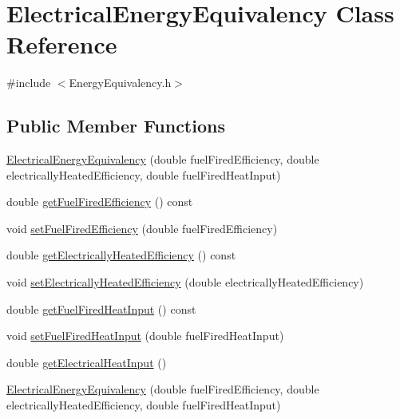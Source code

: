 \hypertarget{class_electrical_energy_equivalency}{}\section{Electrical\+Energy\+Equivalency Class Reference}
\label{class_electrical_energy_equivalency}


{\ttfamily \#include $<$Energy\+Equivalency.\+h$>$}

\subsection*{Public Member Functions}
\begin{DoxyCompactItemize}
\item 
\hyperlink{class_electrical_energy_equivalency_aeec1363ce72c89b00aade01a93200e06}{Electrical\+Energy\+Equivalency} (double fuel\+Fired\+Efficiency, double electrically\+Heated\+Efficiency, double fuel\+Fired\+Heat\+Input)
\item 
double \hyperlink{class_electrical_energy_equivalency_adc8def25354f6ba8c3479040507b0ea6}{get\+Fuel\+Fired\+Efficiency} () const
\item 
void \hyperlink{class_electrical_energy_equivalency_ac73a4dadfeeff737a24b58e805ce9a3a}{set\+Fuel\+Fired\+Efficiency} (double fuel\+Fired\+Efficiency)
\item 
double \hyperlink{class_electrical_energy_equivalency_a83438510f522aa045f4b1007fca1d2fd}{get\+Electrically\+Heated\+Efficiency} () const
\item 
void \hyperlink{class_electrical_energy_equivalency_ab9091e720096a4c088cece14e975ccb4}{set\+Electrically\+Heated\+Efficiency} (double electrically\+Heated\+Efficiency)
\item 
double \hyperlink{class_electrical_energy_equivalency_acb07f4cd7d416922bc355b2f1b3aadb4}{get\+Fuel\+Fired\+Heat\+Input} () const
\item 
void \hyperlink{class_electrical_energy_equivalency_a9daf2b93c52c31cb999e5a9a18f1dd54}{set\+Fuel\+Fired\+Heat\+Input} (double fuel\+Fired\+Heat\+Input)
\item 
double \hyperlink{class_electrical_energy_equivalency_aac8365a7d5b4e111ddbe7fc0c9beecc7}{get\+Electrical\+Heat\+Input} ()
\item 
\hyperlink{class_electrical_energy_equivalency_aeec1363ce72c89b00aade01a93200e06}{Electrical\+Energy\+Equivalency} (double fuel\+Fired\+Efficiency, double electrically\+Heated\+Efficiency, double fuel\+Fired\+Heat\+Input)

\end{DoxyCompactItemize}
